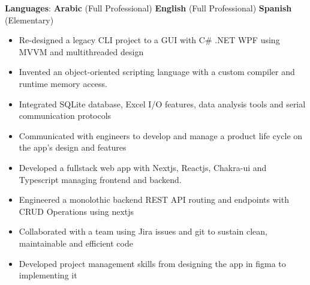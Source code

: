 \documentclass[11pt,a4paper,ragged2e]{altacv}
\begin{document}
\begin{paracol}{1}
\textbf{Languages}:  \textbf{Arabic} (Full Professional) \hfill \textbf{English} (Full Professional) \hfill \textbf{Spanish} (Elementary)



\begin{itemize}
\item Re-designed a legacy CLI project to a GUI with C\# .NET WPF using MVVM and multithreaded design
\item Invented an object-oriented scripting language with a custom compiler and runtime memory access.
\item Integrated SQLite database, Excel I/O features, data analysis tools and serial communication protocols 
\item Communicated with engineers to develop and manage a product life cycle on the app's design and features
\end{itemize}

\tightdivider


\begin{itemize}
\item Developed a fullstack web app with Nextjs, Reactjs, Chakra-ui and Typescript managing frontend and backend.
\item Engineered a monolothic backend REST API routing and endpoints with CRUD Operations using nextjs 
\item Collaborated with a team using Jira issues and git to sustain clean, maintainable and efficient code
\item Developed project management skills from designing the app in figma to implementing it 
\end{itemize}


\end{paracol}
\end{document}
